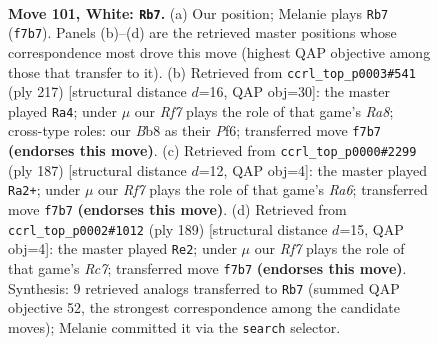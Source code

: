 \documentclass[11pt]{article}
\begin{document}
\clearpage

\begin{figure}[p]\centering
\begin{subfigure}{0.46\textwidth}\centering
\resizebox{\linewidth}{!}{%
\newchessgame
\chessboard[
  setfen={1B4k1/5R2/4r3/7P/4p3/5p2/3K1P2/8 w - - 9 101},
  showmover=false,
  pgfstyle=straightmove, color=movearrow, markmove={f7-b7}
]}
\caption{}
\end{subfigure}\hfill
\begin{subfigure}{0.46\textwidth}\centering
\resizebox{\linewidth}{!}{%
\newchessgame
\chessboard[
  setfen={8/8/5p1k/P6p/1P3p2/8/1K4R1/r7 b - - 1 109},
  showmover=false,
  pgfstyle=straightmove, color=movearrow, markmove={a1-a4}
]}
\caption{}
\end{subfigure}
\\[4pt]
\begin{subfigure}{0.46\textwidth}\centering
\resizebox{\linewidth}{!}{%
\newchessgame
\chessboard[
  setfen={8/8/7k/5R2/6p1/r5P1/3K1P2/8 b - - 93 94},
  showmover=false,
  pgfstyle=straightmove, color=movearrow, markmove={a3-a2}
]}
\caption{}
\end{subfigure}\hfill
\begin{subfigure}{0.46\textwidth}\centering
\resizebox{\linewidth}{!}{%
\newchessgame
\chessboard[
  setfen={8/6k1/3K4/6Pp/5R1P/8/2r5/8 b - - 16 95},
  showmover=false,
  pgfstyle=straightmove, color=movearrow, markmove={c2-e2}
]}
\caption{}
\end{subfigure}
\caption{\textbf{Move 101, White: \texttt{Rb7}.} (a) Our position; Melanie plays \texttt{Rb7} (\texttt{f7b7}). Panels (b)--(d) are the retrieved master positions whose correspondence most drove this move (highest QAP objective among those that transfer to it). (b) Retrieved from \texttt{ccrl\_top\_p0003\#541} (ply 217) [structural distance $d$=16, QAP obj=30]: the master played \texttt{Ra4}; under $\mu$ our \emph{Rf7} plays the role of that game's \emph{Ra8}; cross-type roles: our \emph{B}b8 as their \emph{P}f6; transferred move \texttt{f7b7} \textbf{(endorses this move)}. (c) Retrieved from \texttt{ccrl\_top\_p0000\#2299} (ply 187) [structural distance $d$=12, QAP obj=4]: the master played \texttt{Ra2+}; under $\mu$ our \emph{Rf7} plays the role of that game's \emph{Ra6}; transferred move \texttt{f7b7} \textbf{(endorses this move)}. (d) Retrieved from \texttt{ccrl\_top\_p0002\#1012} (ply 189) [structural distance $d$=15, QAP obj=4]: the master played \texttt{Re2}; under $\mu$ our \emph{Rf7} plays the role of that game's \emph{Rc7}; transferred move \texttt{f7b7} \textbf{(endorses this move)}. Synthesis: 9 retrieved analogs transferred to \texttt{Rb7} (summed QAP objective 52, the strongest correspondence among the candidate moves); Melanie committed it via the \texttt{search} selector.}
\label{fig:thought-m200}
\end{figure}
\end{document}
